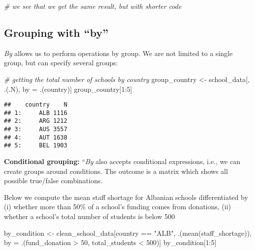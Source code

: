\documentclass[
]{article}
\newenvironment{Shaded}{\begin{snugshade}}{\end{snugshade}}
\newcommand{\CommentTok}[1]{\textcolor[rgb]{0.56,0.35,0.01}{\textit{#1}}}
\newcommand{\DecValTok}[1]{\textcolor[rgb]{0.00,0.00,0.81}{#1}}
\newcommand{\FunctionTok}[1]{\textcolor[rgb]{0.00,0.00,0.00}{#1}}
\newcommand{\NormalTok}[1]{#1}
\newcommand{\OtherTok}[1]{\textcolor[rgb]{0.56,0.35,0.01}{#1}}
\newcommand{\SpecialCharTok}[1]{\textcolor[rgb]{0.00,0.00,0.00}{#1}}
\newcommand{\StringTok}[1]{\textcolor[rgb]{0.31,0.60,0.02}{#1}}
\begin{document}
\begin{Shaded}
\begin{Highlighting}[]
\CommentTok{\# we see that we get the same result, but with shorter code}
\end{Highlighting}
\end{Shaded}

\hypertarget{grouping-with-by}{%
\subsection{Grouping with ``by''}\label{grouping-with-by}}

\emph{By} allows us to perform operations by group. We are not limited
to a single group, but can specify several groups:

\begin{Shaded}
\begin{Highlighting}[]
\CommentTok{\# getting the total number of schools by country}
\NormalTok{group\_country }\OtherTok{\textless{}{-}}\NormalTok{ school\_data[, .(.N), by }\OtherTok{=}\NormalTok{ .(country)]}
\NormalTok{group\_country[}\DecValTok{1}\SpecialCharTok{:}\DecValTok{5}\NormalTok{]}
\end{Highlighting}
\end{Shaded}

\begin{verbatim}
##    country    N
## 1:     ALB 1116
## 2:     ARG 1212
## 3:     AUS 3557
## 4:     AUT 1638
## 5:     BEL 1903
\end{verbatim}

\textbf{Conditional grouping:} ``\emph{By} also accepts conditional
expressions, i.e., we can create groups around conditions. The outcome
is a matrix which shows all possible true/false combinations.

Below we compute the mean staff shortage for Albanian schools
differentiated by (i) whether more than 50\% of a school's funding comes
from donations, (ii) whether a school's total number of students is
below 500

\begin{Shaded}
\begin{Highlighting}[]
\NormalTok{by\_condition }\OtherTok{\textless{}{-}}\NormalTok{ clean\_school\_data[country }\SpecialCharTok{==} \StringTok{"ALB"}\NormalTok{,}
\NormalTok{        .(}\FunctionTok{mean}\NormalTok{(staff\_shortage)),}
\NormalTok{        by }\OtherTok{=}\NormalTok{ .(fund\_donation }\SpecialCharTok{\textgreater{}} \DecValTok{50}\NormalTok{, total\_students }\SpecialCharTok{\textless{}} \DecValTok{500}\NormalTok{)]}
\NormalTok{by\_condition[}\DecValTok{1}\SpecialCharTok{:}\DecValTok{5}\NormalTok{]}
\end{Highlighting}
\end{Shaded}
\end{document}
